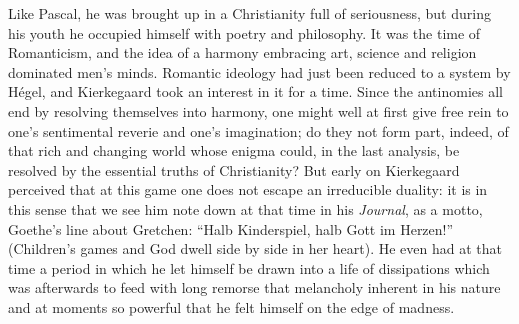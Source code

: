 \documentclass[12pt,a4paper]{article}
\newcommand{\opage}[1]{\marginnote{\footnotesize\textit{[#1]}}}
\begin{document}
\opage{227}Like Pascal, he was brought up in a Christianity full of seriousness, but
during his youth he occupied himself with poetry and philosophy. It was the
time of Romanticism, and the idea of a harmony embracing art, science and
religion dominated men's minds. Romantic ideology had just been reduced to a
system by Hégel,
and Kierkegaard took an interest in it for a time. Since the antinomies all end
by resolving themselves into harmony, one might well at first give free rein to
one's sentimental reverie and one's imagination; do they not form part, indeed,
of that rich and changing world whose enigma could, in the last analysis, be
resolved by the essential truths of Christianity? But early on Kierkegaard
perceived that at this game one does not escape an irreducible duality: it is
in this sense that we see him note down at that time in his \emph{Journal}, as
a motto, Goethe's line about Gretchen: ``Halb Kinderspiel, halb Gott im
Herzen!'' (Children's games and God dwell side by side in her heart).
He even had at that time a period in which he let himself be drawn into a life
of dissipations which was afterwards to feed with long remorse that melancholy
inherent in his nature and at moments so powerful that he felt himself on the
edge of madness.
\end{document}
